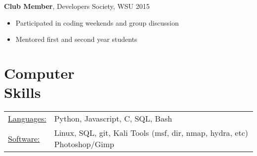 \documentclass[margin]{res}
\begin{document}
\begin{resume}

		{\bf Club Member}, Developers Society, WSU \hfill   2015
                \begin{itemize} \itemsep -2pt
                 \item Participated in coding weekends and group discussion

                 \item Mentored first and second year students
		 \end{itemize}



\section{Computer \\ Skills}
   \begin{tabular}{l p{3in}}
    \underline{Languages:} & Python, Javascript, C, SQL, Bash\\

	   \underline{Software:} &  Linux, SQL, git, Kali Tools (msf, dir, nmap, hydra, etc) Photoshop/Gimp
 \end{tabular}

\end{resume}
\end{document}
